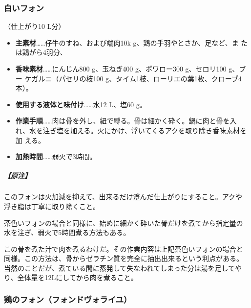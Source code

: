 \begin{recette}
\maeaki

\hypertarget{fonds-blanc}{%
\subsubsection{白いフォン}\label{fonds-blanc}}



（仕上がり10 L分）

\begin{itemize}
\item
  \textbf{主素材}\ldots{}\ldots{}仔牛のすね、および端肉10k
  g、鶏の手羽やとさか、足など、ま たは鶏がら4羽分、
\item
  \textbf{香味素材}\ldots{}\ldots{}にんじん800 g、玉ねぎ400
  g、ポワロー300 g、セロリ100 g、ブー ケガルニ（パセリの枝100
  g、タイム1枝、ローリエの葉1枚、クローブ4本）。
\item
  \textbf{使用する液体と味付け}\ldots{}\ldots{}水12 L、塩60 g。
\item
  \textbf{作業手順}\ldots{}\ldots{}肉は骨を外し、紐で縛る。骨は細かく砕く。鍋に肉と骨を入
  れ、水を注ぎ塩を加える。火にかけ、浮いてくるアクを取り除き香味素材を加
  える。
\item
  \textbf{加熱時間}\ldots{}\ldots{}弱火で3時間。
\end{itemize}

\hypertarget{nota-fonds-blanc}{%
\subparagraph{【原注】}\label{nota-fonds-blanc}}

このフォンは火加減を抑えて、出来るだけ澄んだ仕上がりにすること。アクや
浮き脂は丁寧に取り除くこと。

茶色いフォンの場合と同様に、始めに細かく砕いた骨だけを煮てから指定量の
水を注ぎ、弱火で5時間煮る方法もある。

この骨を煮た汁で肉を煮るわけだ。その作業内容は上記茶色いフォンの場合と
同様。この方法は、骨からゼラチン質を完全に抽出出来るという利点がある。
当然のことだが、煮ている間に蒸発して失なわれてしまった分は湯を足してや
り、全体量を12Lにしてから肉を煮ること。

\maeaki

\hypertarget{fonds-de-volaille}{%
\subsubsection{鶏のフォン（フォンドヴォライユ）}\label{fonds-de-volaille}}


\end{recette}
